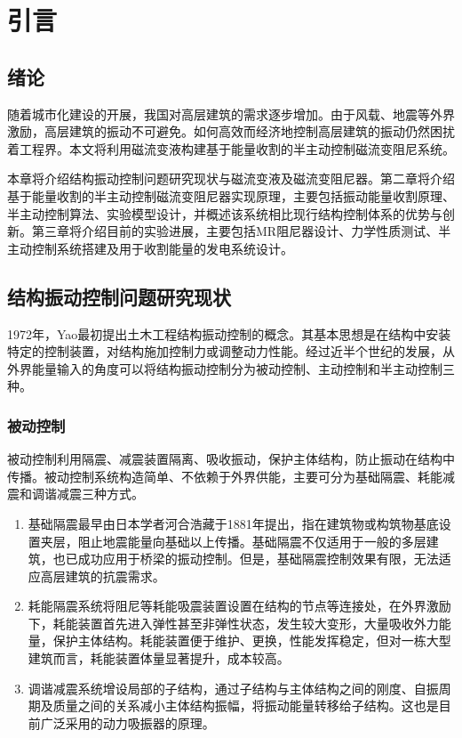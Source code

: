 \section{引言}
\subsection{绪论}
随着城市化建设的开展，我国对高层建筑的需求逐步增加。由于风载、地震等外界激励，高层建筑的振动不可避免。如何高效而经济地控制高层建筑的振动仍然困扰着工程界。本文将利用磁流变液构建基于能量收割的半主动控制磁流变阻尼系统。

本章将介绍结构振动控制问题研究现状与磁流变液及磁流变阻尼器。第二章将介绍基于能量收割的半主动控制磁流变阻尼器实现原理，主要包括振动能量收割原理、半主动控制算法、实验模型设计，并概述该系统相比现行结构控制体系的优势与创新。第三章将介绍目前的实验进展，主要包括MR阻尼器设计、力学性质测试、半主动控制系统搭建及用于收割能量的发电系统设计。

\subsection{结构振动控制问题研究现状}
1972年，Yao最初提出土木工程结构振动控制的概念\cite{yao1972concept}。其基本思想是在结构中安装特定的控制装置，对结构施加控制力或调整动力性能。经过近半个世纪的发展，从外界能量输入的角度可以将结构振动控制分为被动控制、主动控制和半主动控制三种。

\subsubsection{被动控制}
被动控制利用隔震、减震装置隔离、吸收振动，保护主体结构，防止振动在结构中传播。被动控制系统构造简单、不依赖于外界供能，主要可分为基础隔震、耗能减震和调谐减震三种方式。
\begin{enumerate}[leftmargin=*,labelindent=16pt,label=\bfseries \arabic*.]
	\item 基础隔震最早由日本学者河合浩藏于1881年提出，指在建筑物或构筑物基底设置夹层，阻止地震能量向基础以上传播。基础隔震不仅适用于一般的多层建筑，也已成功应用于桥梁的振动控制。但是，基础隔震控制效果有限，无法适应高层建筑的抗震需求\cite{Sun2012}。
	\item 耗能隔震系统将阻尼等耗能吸震装置设置在结构的节点等连接处，在外界激励下，耗能装置首先进入弹性甚至非弹性状态，发生较大变形，大量吸收外力能量，保护主体结构。耗能装置便于维护、更换，性能发挥稳定，但对一栋大型建筑而言，耗能装置体量显著提升，成本较高。
	\item 调谐减震系统增设局部的子结构，通过子结构与主体结构之间的刚度、自振周期及质量之间的关系减小主体结构振幅，将振动能量转移给子结构。这也是目前广泛采用的动力吸振器的原理。

\end{enumerate}

